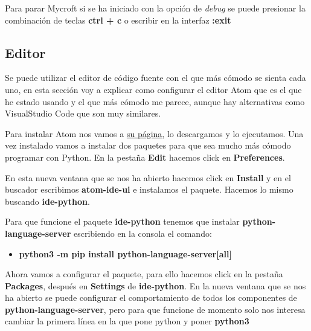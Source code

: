Para parar Mycroft si se ha iniciado con la opción de \textit{debug} se puede presionar la combinación de teclas \textbf{ctrl + c} o escribir en la interfaz \textbf{:exit}

\subsection{Editor}

Se puede utilizar el editor de código fuente con el que más cómodo se sienta cada uno, en esta sección voy a explicar como configurar el editor Atom que es el que he estado usando y el que más cómodo me parece, aunque hay alternativas como VisualStudio Code que son muy similares.

Para instalar Atom nos vamos a \href{https://atom.io/}{su página}, lo descargamos y lo ejecutamos. Una vez instalado vamos a instalar dos paquetes para que sea mucho más cómodo programar con Python. En la pestaña \textbf{Edit} hacemos click en \textbf{Preferences}.


En esta nueva ventana que se nos ha abierto hacemos click en \textbf{Install} y en el buscador escribimos \textbf{atom-ide-ui} e instalamos el paquete. Hacemos lo mismo buscando \textbf{ide-python}.

 

Para que funcione el paquete \textbf{ide-python} tenemos que instalar \textbf{python-language-server} escribiendo en la consola el comando:
\begin{itemize}
	\item \textbf{python3 -m pip install python-language-server[all]}
\end{itemize}


Ahora vamos a configurar el paquete, para ello hacemos click en la pestaña \textbf{Packages}, después en \textbf{Settings} de \textbf{ide-python}. En la nueva ventana que se nos ha abierto se puede configurar el comportamiento de todos los componentes de \textbf{python-language-server}, pero para que funcione de momento solo nos interesa cambiar la primera línea en la que pone python y poner \textbf{python3}

 


